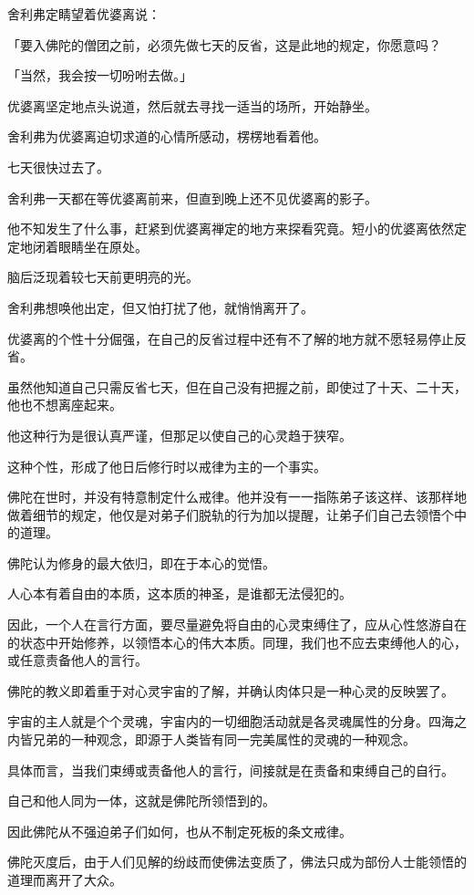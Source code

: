 \documentclass[twoside,openany]{book}
\begin{document}
舍利弗定睛望着优婆离说：

「要入佛陀的僧团之前，必须先做七天的反省，这是此地的规定，你愿意吗？

「当然，我会按一切吩咐去做。」

优婆离坚定地点头说道，然后就去寻找一适当的场所，开始静坐。

舍利弗为优婆离迫切求道的心情所感动，楞楞地看着他。

七天很快过去了。

舍利弗一天都在等优婆离前来，但直到晚上还不见优婆离的影子。

他不知发生了什么事，赶紧到优婆离禅定的地方来探看究竟。短小的优婆离依然定定地闭着眼睛坐在原处。

脑后泛现着较七天前更明亮的光。

舍利弗想唤他出定，但又怕打扰了他，就悄悄离开了。

优婆离的个性十分倔强，在自己的反省过程中还有不了解的地方就不愿轻易停止反省。

虽然他知道自己只需反省七天，但在自己没有把握之前，即使过了十天、二十天，他也不想离座起来。

他这种行为是很认真严谨，但那足以使自己的心灵趋于狭窄。

这种个性，形成了他日后修行时以戒律为主的一个事实。

佛陀在世时，并没有特意制定什么戒律。他并没有一一指陈弟子该这样、该那样地做着细节的规定，他仅是对弟子们脱轨的行为加以提醒，让弟子们自己去领悟个中的道理。

佛陀认为修身的最大依归，即在于本心的觉悟。

人心本有着自由的本质，这本质的神圣，是谁都无法侵犯的。

因此，一个人在言行方面，要尽量避免将自由的心灵束缚住了，应从心性悠游自在的状态中开始修养，以领悟本心的伟大本质。同理，我们也不应去束缚他人的心，或任意责备他人的言行。

佛陀的教义即着重于对心灵宇宙的了解，并确认肉体只是一种心灵的反映罢了。

宇宙的主人就是个个灵魂，宇宙内的一切细胞活动就是各灵魂属性的分身。四海之内皆兄弟的一种观念，即源于人类皆有同一完美属性的灵魂的一种观念。

具体而言，当我们束缚或责备他人的言行，间接就是在责备和束缚自己的自行。

自己和他人同为一体，这就是佛陀所领悟到的。

因此佛陀从不强迫弟子们如何，也从不制定死板的条文戒律。

佛陀灭度后，由于人们见解的纷歧而使佛法变质了，佛法只成为部份人士能领悟的道理而离开了大众。
\end{document}
